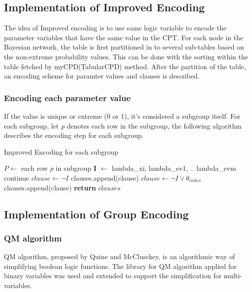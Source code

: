     \subsection{Implementation of Improved Encoding}
    The idea of Improved encoding is to use same logic variable to encode the parameter variables that have the same value in the CPT. For each node in the Bayesian network, the table is first partitioned in to several sub-tables based on the non-extreme probability values. This can be done with the sorting within the table fetched by myCPD(TabularCPD) method. After the partition of the table, an encoding scheme for paramter values and clauses is described.
    
    \subsubsection{Encoding each parameter value}
    If the value is unique or extreme (0 or 1), it's considered a subgroup itself. For each subgroup, let \textit{p} denotes each row in the subgroup, the following algorithm describes the encoding step for each subgroup.
    \begin{algorithm}
    \caption{Improved Encoding for each subgroup}\label{algorithm:encode group}
    \begin{algorithmic}[1]
    \State $P \gets$ each row \textit{p} in subgroup 
        \State \textbf{I} $\gets$ lambda\_xi, lambda\_ev1, .. lambda\_evm
                \State continue
            \EndIf
                \State $clause \gets \neg I$
                \State clauses.append(clause)
            \Else
                \State $clause \gets \neg I \vee \theta_{index}$
                \State clauses.append(clause)
            \EndIf
        \EndFor
    \EndFor
    \State \textbf{return} $clauses$
    \EndProcedure
    \end{algorithmic}
    \end{algorithm}
    \subsection{Implementation of Group Encoding}
    \subsubsection{QM algorithm}
    QM algorithm, proposed by Quine and McClusckey, is an algorithmic way of simplifying boolean logic functions. The library for QM algorithm applied for binary variables was used and extended to support the simplification for multi-variables.
    
